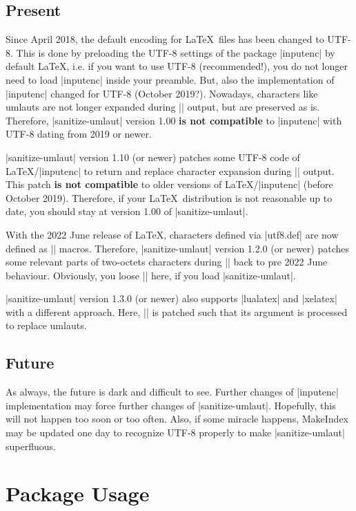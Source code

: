 \documentclass[a4paper,11pt]{ltxdoc}
\begin{document}
\subsection{Present}
Since April 2018, the default encoding for \LaTeX\ files has been changed to UTF-8.
This is done by preloading the UTF-8 settings of the package |inputenc|
by default \LaTeX, i.e. if you want to use UTF-8 (recommended!), you do not
longer need to load |inputenc| inside your preamble.
But, also the implementation of |inputenc| changed for UTF-8 (October 2019?).
Nowadays, characters like umlauts are not longer expanded during |\index| output,
but are preserved as is.
Therefore, |sanitize-umlaut| version 1.00 \textbf{is not compatible} to
|inputenc| with UTF-8 dating from 2019 or newer.

|sanitize-umlaut| version 1.10 (or newer) patches some UTF-8 code of
\LaTeX/|inputenc| to return and replace character expansion during |\index| output.
This patch \textbf{is not compatible} to older versions of \LaTeX/|inputenc| (before October 2019).
Therefore, if your \LaTeX\ distribution is not reasonable up to date, you
should stay at version 1.00 of |sanitize-umlaut|.

With the 2022 June release of \LaTeX, characters defined via |utf8.def| are now
defined as |\protected| macros. Therefore, |sanitize-umlaut| version 1.2.0 (or newer)
patches some relevant parts of two-octets characters during |\index| back to
pre 2022 June behaviour. Obviously, you loose |\protected| here, if you
load |sanitize-umlaut|.

|sanitize-umlaut| version 1.3.0 (or newer) also supports |lualatex| and |xelatex|
with a different approach. Here, |\index| is patched such that its argument
is processed to replace umlauts.

\subsection{Future}
As always, the future is dark and difficult to see. Further changes of
|inputenc| implementation may force further changes of |sanitize-umlaut|.
Hopefully, this will not happen too soon or too often.
Also, if some miracle happens, MakeIndex may be updated one day to
recognize UTF-8 properly to make |sanitize-umlaut| superfluous.


\clearpage
\section{Package Usage}%
\end{document}

